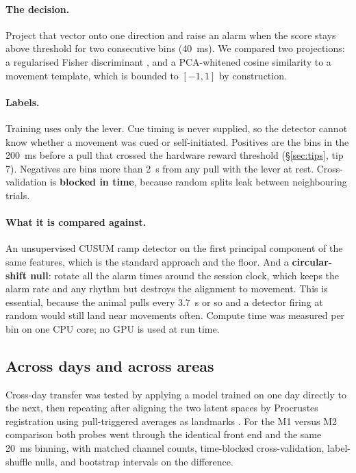 \documentclass[11pt]{article}
\begin{document}
\paragraph{The decision.} Project that vector onto one direction and raise an
alarm when the score stays above threshold for two consecutive bins (40~ms). We
compared two projections: a regularised Fisher discriminant \cite{fisher1936},
and a PCA-whitened cosine similarity to a movement template, which is bounded to
$[-1,1]$ by construction.

\paragraph{Labels.} Training uses only the lever. Cue timing is never supplied,
so the detector cannot know whether a movement was cued or self-initiated.
Positives are the bins in the 200~ms before a pull that crossed the hardware
reward threshold (\S\ref{sec:tips}, tip 7). Negatives are bins more than 2~s from
any pull with the lever at rest. Cross-validation is \textbf{blocked in time},
because random splits leak between neighbouring trials.

\paragraph{What it is compared against.} An unsupervised CUSUM \cite{page1954}
ramp detector on the first principal component of the same features, which is the
standard approach and the floor. And a \textbf{circular-shift null}: rotate all
the alarm times around the session clock, which keeps the alarm rate and any
rhythm but destroys the alignment to movement. This is essential, because the
animal pulls every 3.7~s or so and a detector firing at random would still land
near movements often. Compute time was measured per bin on one CPU core; no GPU
is used at run time.

\subsection{Across days and across areas}

Cross-day transfer was tested by applying a model trained on one day directly to
the next, then repeating after aligning the two latent spaces by Procrustes
registration using pull-triggered averages as landmarks
\cite{gallego2020,degenhart2020}. For the M1 versus M2 comparison both probes
went through the identical front end and the same 20~ms binning, with matched
channel counts, time-blocked cross-validation, label-shuffle nulls, and bootstrap
intervals on the difference.
\end{document}
